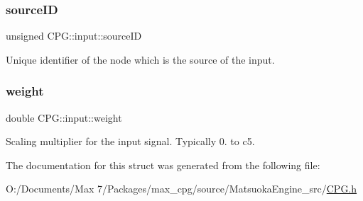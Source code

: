 \subsubsection{\texorpdfstring{source\+ID}{sourceID}}
{\footnotesize\ttfamily unsigned C\+P\+G\+::input\+::source\+ID}

Unique identifier of the node which is the source of the input. \mbox{\label{structCPG_1_1input_a866947e5b7bc9ab1005a2ca72713450c}} 
\subsubsection{\texorpdfstring{weight}{weight}}
{\footnotesize\ttfamily double C\+P\+G\+::input\+::weight}

Scaling multiplier for the input signal. Typically 0. to c5. 

The documentation for this struct was generated from the following file\+:\begin{DoxyCompactItemize}
\item 
O\+:/\+Documents/\+Max 7/\+Packages/max\+\_\+cpg/source/\+Matsuoka\+Engine\+\_\+src/\mbox{\hyperlink{CPG_8h}{C\+P\+G.\+h}}\end{DoxyCompactItemize}
